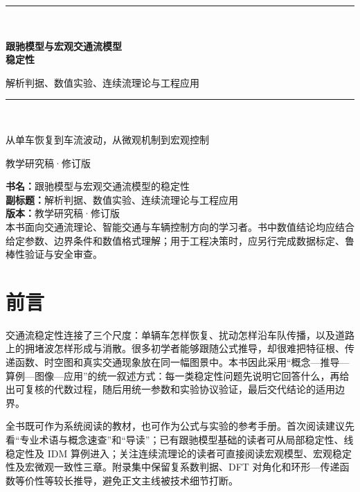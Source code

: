 \documentclass[11pt,a4paper,openany]{book}
\numberwithin{equation}{chapter}
\numberwithin{figure}{chapter}
\numberwithin{table}{chapter}
\begin{document}
\frontmatter
\begin{titlepage}
  \thispagestyle{empty}
  \centering
  \vspace*{0.13\textheight}
  {\color{navy}\rule{0.72\textwidth}{1.2pt}}\\[1.8em]
  {\sffamily\bfseries\fontsize{30}{40}\selectfont
   跟驰模型与宏观交通流模型\\[0.28em]稳定性\par}
  \vspace{1.1em}
  {\sffamily\Large 解析判据、数值实验、连续流理论与工程应用\par}
  \vspace{1.8em}
  {\color{navy}\rule{0.72\textwidth}{0.7pt}}\\[3.5em]
  {\quotefont\large 从单车恢复到车流波动，从微观机制到宏观控制\par}
  \vfill
  {\sffamily\large 教学研究稿·修订版\par}
  \vspace{0.7em}
  {\par}
\end{titlepage}

\thispagestyle{empty}
\vspace*{\fill}
{\small
\noindent\textbf{书名：}跟驰模型与宏观交通流模型的稳定性\\
\textbf{副标题：}解析判据、数值实验、连续流理论与工程应用\\
\textbf{版本：}教学研究稿·修订版\\[0.8em]
本书面向交通流理论、智能交通与车辆控制方向的学习者。书中数值结论均应结合给定参数、边界条件和数值格式理解；用于工程决策时，应另行完成数据标定、鲁棒性验证与安全审查。
}
\clearpage

\chapter*{前言}
交通流稳定性连接了三个尺度：单辆车怎样恢复、扰动怎样沿车队传播，以及道路上的拥堵波怎样形成与消散。很多初学者能够跟随公式推导，却很难把特征根、传递函数、时空图和真实交通现象放在同一幅图景中。本书因此采用“概念—推导—算例—图像—应用”的统一叙述方式：每一类稳定性问题先说明它回答什么，再给出可复核的代数过程，随后用统一参数和实验协议验证，最后交代结论的适用边界。

全书既可作为系统阅读的教材，也可作为公式与实验的参考手册。首次阅读建议先看“专业术语与概念速查”和“导读”；已有跟驰模型基础的读者可从局部稳定性、线稳定性及 IDM 算例进入；关注连续流理论的读者可直接阅读宏观模型、宏观稳定性及宏微观一致性三章。附录集中保留复系数判据、DFT 对角化和环形—传递函数等价性等较长推导，避免正文主线被技术细节打断。
\end{document}

